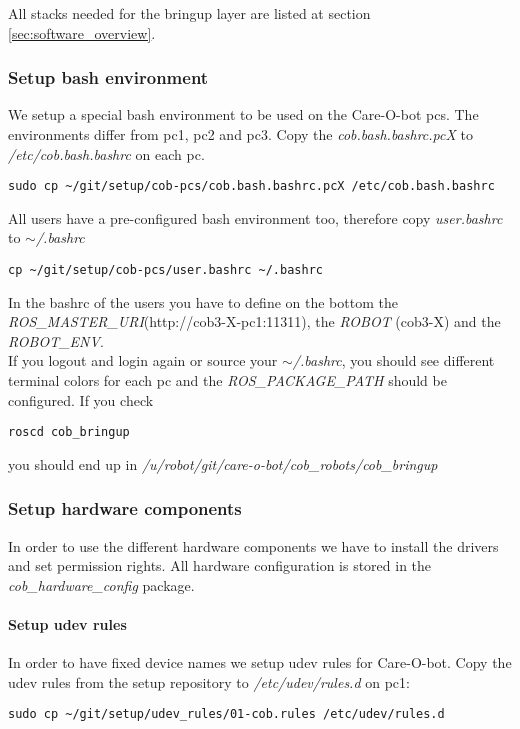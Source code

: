 All stacks needed for the bringup layer are listed at section \ref{sec:software_overview}.

\subsubsection{Setup bash environment}
We setup a special bash environment to be used on the Care-O-bot pcs. The environments differ from pc1, pc2 and pc3. Copy the \textit{cob.bash.bashrc.pcX} to \textit{/etc/cob.bash.bashrc} on each pc.

\begin{lstlisting}
sudo cp ~/git/setup/cob-pcs/cob.bash.bashrc.pcX /etc/cob.bash.bashrc
\end{lstlisting}

All users have a pre-configured bash environment too, therefore copy \textit{user.bashrc} to \textit{$\sim$/.bashrc}
\begin{lstlisting}
cp ~/git/setup/cob-pcs/user.bashrc ~/.bashrc
\end{lstlisting}
In the bashrc of the users you have to define on the bottom the \textit{ROS\_MASTER\_URI}(http://cob3-X-pc1:11311), the \textit{ROBOT} (cob3-X) and the \textit{ROBOT\_ENV}.\\
If you logout and login again or source your \textit{$\sim$/.bashrc}, you should see different terminal colors for each pc and the \textit{ROS\_PACKAGE\_PATH} should be configured. If you check 
\begin{lstlisting}
roscd cob_bringup
\end{lstlisting}
you should end up in \textit{/u/robot/git/care-o-bot/cob\_robots/cob\_bringup}

\subsubsection{Setup hardware components}
In order to use the different hardware components we have to install the drivers and set permission rights. All hardware configuration is stored in the \textit{cob\_hardware\_config} package.

\paragraph{Setup udev rules}
In order to have fixed device names we setup udev rules for Care-O-bot. Copy the udev rules from the setup repository to \textit{/etc/udev/rules.d} on pc1:
\begin{lstlisting}
sudo cp ~/git/setup/udev_rules/01-cob.rules /etc/udev/rules.d
\end{lstlisting}

